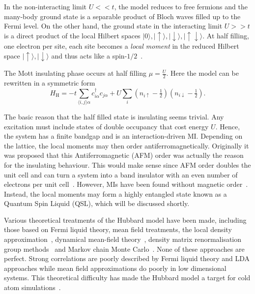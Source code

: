 In the non-interacting limit \(U << t\), the model reduces to free fermions and the many-body ground state is a separable product of Bloch waves filled up to the Fermi level. On the other hand, the ground state in the interacting limit \(U >> t\) is a direct product of the local Hilbert spaces \(|0\rangle, |\uparrow\rangle, |\downarrow\rangle, |\uparrow\downarrow\rangle\). At half filling, one electron per site, each site becomes a \emph{local moment} in the reduced Hilbert space \(|\uparrow\rangle, |\downarrow\rangle\) and thus acts like a spin-\(1/2\)~\autocite{hubbardElectronCorrelationsNarrow1964}.

The Mott insulating phase occurs at half filling \(\mu = \tfrac{U}{2}\). Here the model can be rewritten in a symmetric form \[ H_{\mathrm{H}} = -t \sum_{\langle i,j \rangle \alpha} c^\dagger_{i\alpha} c_{j\alpha} + U \sum_i (n_{i\uparrow} - \tfrac{1}{2})(n_{i\downarrow} - \tfrac{1}{2}).\]

The basic reason that the half filled state is insulating seems trivial. Any excitation must include states of double occupancy that cost energy \(U\). Hence, the system has a finite bandgap and is an interaction-driven MI. Depending on the lattice, the local moments may then order antiferromagnetically. Originally it was proposed that this Antiferromagnetic (AFM) order was actually the reason for the insulating behaviour. This would make sense since AFM order doubles the unit cell and can turn a system into a band insulator with an even number of electrons per unit cell~\autocite{mottMetalInsulatorTransitions1990}. However, MIs have been found without magnetic order~\autocite{law1TTaS2QuantumSpin2017,ribakGaplessExcitationsGround2017}. Instead, the local moments may form a highly entangled state known as a Quantum Spin Liquid (QSL), which will be discussed shortly.

Various theoretical treatments of the Hubbard model have been made, including those based on Fermi liquid theory, mean field treatments, the local density approximation~\autocite{slaterMagneticEffectsHartreeFock1951}, dynamical mean-field theory~\autocite{greinerQuantumPhaseTransition2002}, density matrix renormalisation group methods~\autocite{hallbergNewTrendsDensity2006,schollwöckDensitymatrixRenormalizationGroup2005,whiteDensityMatrixFormulation1992} and Markov chain Monte Carlo~\autocite{blankenbeclerMonteCarloCalculations1981,hirschDiscreteHubbardStratonovichTransformation1983,whiteNumericalStudyTwodimensional1989}. None of these approaches are perfect. Strong correlations are poorly described by Fermi liquid theory and LDA approaches while mean field approximations do poorly in low dimensional systems. This theoretical difficulty has made the Hubbard model a target for cold atom simulations~\autocite{mazurenkoColdatomFermiHubbard2017}.


